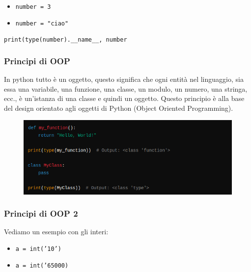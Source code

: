 \documentclass{beamer}
\begin{document}
{\begin{frame}
    \begin{itemize}
        \item  \texttt{number = 3}
    
        \item \texttt{number = "ciao"}
        
    \end{itemize}

    \texttt{print(type(number).__name__, number}

\end{frame}

\begin{frame}
    
    \frametitle{Principi di OOP}
    In python tutto è un oggetto, questo significa che ogni entità nel linguaggio, sia essa una variabile, una funzione, una classe, un modulo, un numero, una stringa, ecc., è un'istanza di una classe e quindi un oggetto. Questo principio è alla base del design orientato agli oggetti di Python (Object Oriented Programming).

    \begin{figure}
        \centering
        \includegraphics[width=1\linewidth]{pics/oop.png}
    \end{figure}


\end{frame}

\begin{frame}
    
    \frametitle{Principi di OOP 2}

    Vediamo un esempio con gli interi:
    
    \begin{itemize}
        \item \texttt{a = int('10')}
   
        \item \texttt{a = int('65000)}
        
    \end{itemize}


\end{frame}}
\end{document}
